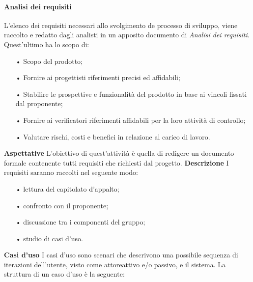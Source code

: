 			\paragraph{Analisi dei requisiti}
			L'elenco dei requisiti necessari allo svolgimento de processo di sviluppo, viene raccolto e redatto dagli analisti in un apposito documento di \textit{Analisi dei requisiti}. Quest'ultimo ha lo scopo di:
				\begin{itemize}
					\item[•] Scopo del prodotto;
					\item[•] Fornire ai progettisti riferimenti precisi ed affidabili;
					\item[•] Stabilire le prospettive e funzionalità del prodotto in base ai vincoli fissati dal proponente;
					\item[•] Fornire ai verificatori riferimenti affidabili per la loro attività di controllo;
					\item[•] Valutare rischi, costi e benefici in relazione al carico di lavoro.
				\end{itemize} \newline
			\textbf{Aspettative} \newline \newline
			L'obiettivo di quest'attività è quella di redigere un documento formale contenente tutti requisiti che richiesti dal progetto.\newline \newline
			\textbf{Descrizione} \newline \newline
			I requisiti saranno raccolti nel seguente modo:
				\begin{itemize} \newline
					\item[•] lettura del capitolato d'appalto;
					\item[•] confronto con il proponente;
					\item[•] discussione tra i componenti del gruppo;
					\item[•] studio di casi d'uso.
				\end{itemize}
				\newline \newline
				\textbf{Casi d'uso} \newline \newline
				I casi d'uso sono scenari che descrivono una possibile sequenza di iterazioni dell'utente, visto come attore\glo attivo e/o passivo, e il sistema. La struttura di un caso d'uso è la seguente:
